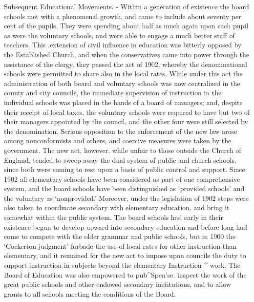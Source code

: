 \documentclass[]{book}
\begin{document}
Subsequent Educational Movements. - Within a generation of existence the board schools met with a phenom\protect\hypertarget{ch25.xmlux5cux23para.467.2.0.box.296.236.1055.1721.q.60}{}{enal growth, and came to include about seventy per cent of the pupils. They were spending about half as much again upon each pupil as were the voluntary schools, and were able to engage a much better staff of teachers. This .extension of civil influence in education was bitterly opposed by the Established Church, and when the conservatives came into power through the assistance of the clergy, they passed the act of 1902, whereby the denominational schools were permitted to share also in the local rates. While under this act the administration of both board and voluntary schools was now centralized in the county and city councils, the immediate supervision of instruction in the individual schools was placed in the hands of a board of managers; and, despite their receipt of local taxes, the voluntary schools were required to have but two of their managers appointed by the council, and the other four were still selected by the denomination. Serious opposition to the enforcement of the new law arose among nonconformists and others, and coercive measures were taken by the government. The new act, however, while unfair to those outside the Church of England, tended to sweep away the dual system of public and church schools, since both were coming to rest upon a basis of public control and support. Since 1902 all elementary schools have been considered as part of one comprehensive system, and the board schools have been distinguished as `provided schools' and the voluntary as `nonprovided.' Moreover, under the legislation of 1902 steps were also taken to coordinate secondary with elementary education, and bring it somewhat within the public system. The board schools had early in their existence begun to develop upward into}\protect\hypertarget{ch25.xmlux5cux23para.468.1.0.box.114.234.1264.530.q.60}{}{ secondary education and before long had come to compete with the older grammar and public schools, but in 1900 the `Cockerton judgment' forbade the use of local rates for other instruction than elementary, and it remained for the new act to impose upon councils the duty to support instruction in subjects beyond the elementary Instruction \^{} work. The Board of Education was also empowered to pub\^{}Spen'se. inspect the work of the great public schools and other endowed secondary institutions, and to allow grants to all schools meeting the conditions of the Board.}
\end{document}

